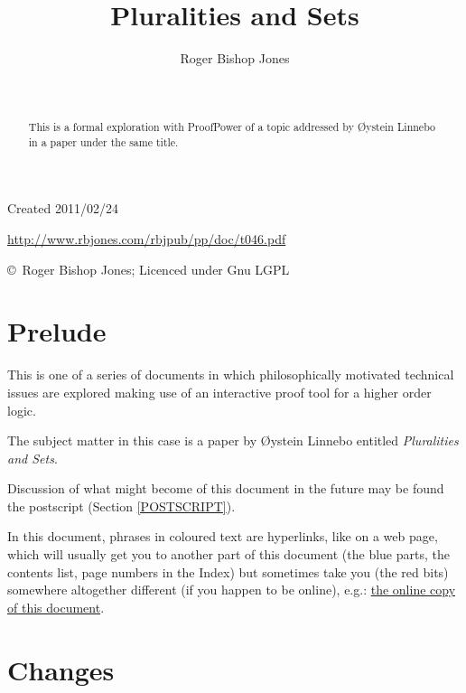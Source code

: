 \documentclass[11pt]{article}
\title{Pluralities and Sets}
\author{Roger Bishop Jones}
\date{\ }
\begin{document}
\begin{titlepage}
\maketitle
\begin{abstract}
This is a formal exploration with ProofPower of a topic addressed by {\O}ystein Linnebo in a paper under the same title.
\end{abstract}
\vfill

\begin{centering}
{\footnotesize

Created 2011/02/24



\href{http://www.rbjones.com/rbjpub/pp/doc/t046.pdf}
{http://www.rbjones.com/rbjpub/pp/doc/t046.pdf}

\copyright\ Roger Bishop Jones; Licenced under Gnu LGPL

}%
\end{centering}

\thispagestyle{empty}
\end{titlepage}

\newpage
\addtocounter{page}{1}
{\parskip=0pt\tableofcontents}

\section{Prelude}

This is one of a series of documents in which philosophically motivated technical issues are explored making use of an interactive proof tool for a higher order logic.

The subject matter in this case is a paper by {\O}ystein Linnebo entitled \emph{Pluralities and Sets}\cite{linneboPS}.

Discussion of what might become of this document in the future may be found the postscript (Section \ref{POSTSCRIPT}).

In this document, phrases in coloured text are hyperlinks, like on a web page, which will usually get you to another part of this document (the blue parts, the contents list, page numbers in the Index) but sometimes take you (the red bits) somewhere altogether different (if you happen to be online), e.g.: \href{http://rbjones.com/rbjpub/pp/doc/t046.pdf}{the online copy of this document}.

\section{Changes}
\end{document}
